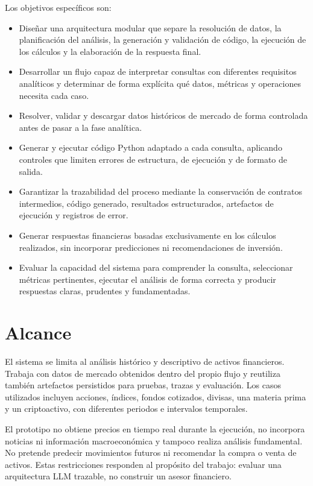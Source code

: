 Los objetivos espec\'ificos son:

\begin{itemize}
    \item Dise\~nar una arquitectura modular que separe la resoluci\'on de datos, la planificaci\'on del an\'alisis, la generaci\'on y validaci\'on de c\'odigo, la 
    ejecuci\'on de los c\'alculos y la elaboraci\'on de la respuesta final.
    \item Desarrollar un flujo capaz de interpretar consultas con diferentes requisitos anal\'iticos y determinar de forma expl\'icita qu\'e datos, m\'etricas y 
    operaciones necesita cada caso.
    \item Resolver, validar y descargar datos hist\'oricos de mercado de forma controlada antes de pasar a la fase anal\'itica.
    \item Generar y ejecutar c\'odigo Python adaptado a cada consulta, aplicando controles que limiten errores de estructura, de ejecuci\'on y de formato de salida.
    \item Garantizar la trazabilidad del proceso mediante la conservaci\'on de contratos intermedios, c\'odigo generado, resultados estructurados, artefactos de 
    ejecuci\'on y registros de error.
    \item Generar respuestas financieras basadas exclusivamente en los c\'alculos realizados, sin incorporar predicciones ni recomendaciones de inversi\'on.
    \item Evaluar la capacidad del sistema para comprender la consulta, seleccionar m\'etricas pertinentes, ejecutar el an\'alisis de forma correcta y producir 
    respuestas claras, prudentes y fundamentadas.
\end{itemize}

\section{Alcance}

El sistema se limita al an\'alisis hist\'orico y descriptivo de activos financieros. Trabaja con datos de mercado obtenidos dentro del propio flujo y reutiliza tambi\'en 
artefactos persistidos para pruebas, trazas y evaluaci\'on. Los casos utilizados incluyen acciones, \'indices, fondos cotizados, divisas, una materia prima y un 
criptoactivo, con diferentes periodos e intervalos temporales.

El prototipo no obtiene precios en tiempo real durante la ejecuci\'on, no incorpora noticias ni informaci\'on macroecon\'omica y tampoco realiza an\'alisis fundamental. 
No pretende predecir movimientos futuros ni recomendar la compra o venta de activos. Estas restricciones responden al prop\'osito del trabajo: evaluar una arquitectura 
LLM trazable, no construir un asesor financiero.

